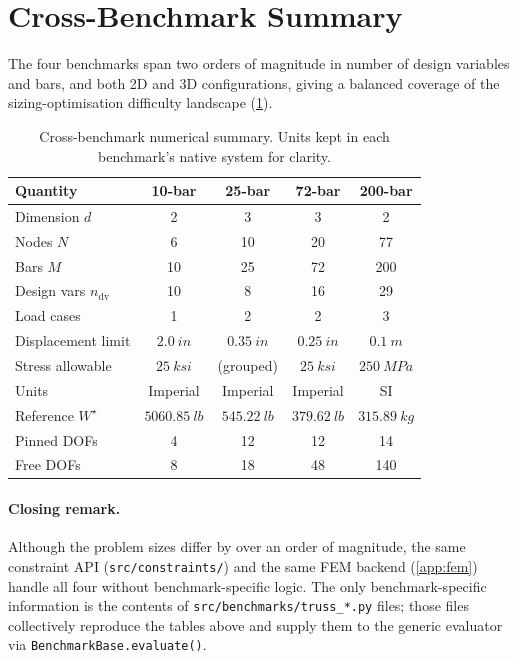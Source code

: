 \section{Cross-Benchmark Summary}
\label{app:geom:summary}

The four benchmarks span two orders of magnitude in number of
design variables and bars, and both 2D and 3D configurations,
giving a balanced coverage of the sizing-optimisation difficulty
landscape (\cref{tab:geom:summary}).

\begin{table}[h]
  \centering
  \caption{Cross-benchmark numerical summary. Units kept in each
    benchmark's native system for clarity.}
  \label{tab:geom:summary}
  \small
  \begin{tabular}{lcccc}
    \toprule
    Quantity & 10-bar & 25-bar & 72-bar & 200-bar \\
    \midrule
    Dimension $d$          & 2     & 3     & 3     & 2 \\
    Nodes $N$              & 6     & 10    & 20    & 77 \\
    Bars $M$               & 10    & 25    & 72    & 200 \\
    Design vars $n_\mathrm{dv}$ & 10  & 8   & 16   & 29 \\
    Load cases             & 1     & 2     & 2     & 3 \\
    Displacement limit     & $\SI{2.0}{in}$ & $\SI{0.35}{in}$ & $\SI{0.25}{in}$ & $\SI{0.1}{m}$ \\
    Stress allowable       & $\SI{25}{ksi}$ & (grouped) & $\SI{25}{ksi}$ & $\SI{250}{MPa}$ \\
    Units                  & Imperial & Imperial & Imperial & SI \\
    Reference $W^\star$     & $\SI{5060.85}{lb}$ & $\SI{545.22}{lb}$ & $\SI{379.62}{lb}$ & $\SI{315.89}{kg}$ \\
    Pinned DOFs            & 4     & 12    & 12    & 14 \\
    Free DOFs              & 8     & 18    & 48    & 140 \\
    \bottomrule
  \end{tabular}
\end{table}

\paragraph{Closing remark.} Although the problem sizes differ by
over an order of magnitude, the same constraint API
(\texttt{src/constraints/}) and the same FEM backend
(\cref{app:fem}) handle all four without benchmark-specific
logic. The only benchmark-specific information is the contents of
\texttt{src/benchmarks/truss\_*.py} files; those files
collectively reproduce the tables above and supply them to the
generic evaluator via \texttt{BenchmarkBase.evaluate()}.
